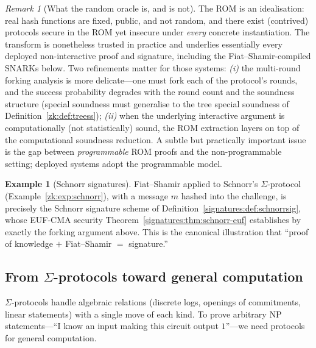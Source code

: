 \documentclass[11pt,a4paper]{article}
\theoremstyle{definition}
\newtheorem{example}[theorem]{Example}
\theoremstyle{remark}
\newtheorem{remark}[theorem]{Remark}
\begin{document}
\begin{remark}[What the random oracle is, and is not]\label{zk:rem:romcaveat}
The ROM is an idealisation: real hash functions are fixed, public, and not random, and there exist (contrived) protocols secure in the ROM yet insecure under \emph{every} concrete instantiation. The transform is nonetheless trusted in practice and underlies essentially every deployed non-interactive proof and signature, including the Fiat--Shamir-compiled SNARKs below. Two refinements matter for those systems: \emph{(i)} the multi-round forking analysis is more delicate---one must fork each of the protocol's rounds, and the success probability degrades with the round count and the soundness structure (special soundness must generalise to the tree special soundness of Definition~\ref{zk:def:treess}); \emph{(ii)} when the underlying interactive argument is computationally (not statistically) sound, the ROM extraction layers on top of the computational soundness reduction. A subtle but practically important issue is the gap between \emph{programmable} ROM proofs and the non-programmable setting; deployed systems adopt the programmable model.
\end{remark}

\begin{example}[Schnorr signatures]\label{zk:exp:schnorrsig}
Fiat--Shamir applied to Schnorr's \(\Sigma\)-protocol (Example~\ref{zk:exp:schnorr}), with a message \(m\) hashed into the challenge, is precisely the Schnorr signature scheme of Definition~\ref{signatures:def:schnorrsig}, whose EUF-CMA security Theorem~\ref{signatures:thm:schnorr-euf} establishes by exactly the forking argument above. This is the canonical illustration that ``proof of knowledge \(+\) Fiat--Shamir \(=\) signature.''
\end{example}

\subsection{From \(\Sigma\)-protocols toward general computation}\label{zk:subsec:general}

\(\Sigma\)-protocols handle algebraic relations (discrete logs, openings of commitments, linear statements) with a single move of each kind. To prove arbitrary \textsf{NP} statements---``I know an input making this circuit output \(1\)''---we need protocols for general computation.
\end{document}
